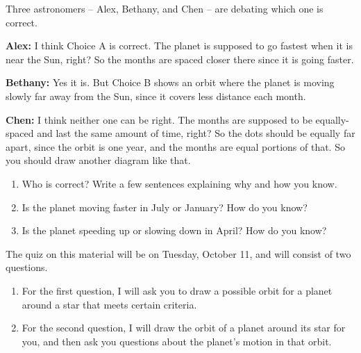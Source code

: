 \documentclass[12pt]{article}
\begin{document}
Three astronomers -- Alex, Bethany, and Chen -- are debating which one is correct.


{\bf Alex:} I think Choice A is correct. The planet is supposed to go fastest when it is near the Sun, right? So the months are spaced closer there since it is going faster.

{\bf Bethany:} Yes it is. But Choice B shows an orbit where the planet is moving slowly far away from the Sun, since it covers less distance each month.

{\bf Chen:} I think neither one can be right. The months are supposed to be equally-spaced and last the same amount of time, right? So the dots should be equally far apart, since the orbit is one year, and the months are equal portions of that. So you should draw another diagram like that.
\begin{enumerate}	

\item Who is correct? Write a few sentences explaining why and how you know.


\vspace{3in}

\item Is the planet moving faster in July or January? How do you know?


\vspace{1.5in}

\item Is the planet speeding up or slowing down in April? How do you know?

\vspace{1.5in}
	
\end{enumerate}

\begin{center}\underline{\hspace{3in}}\end{center}

The quiz on this material will be on Tuesday, October 11, and will consist of two questions.

\begin{enumerate}
	\item For the first question, I will ask you to draw a possible orbit for a planet around a star that meets certain criteria.
	
	\item For the second question, I will draw the orbit of a planet around its star for you, and then ask you questions about the planet's motion in that orbit.
\end{enumerate}

	
\end{document}
